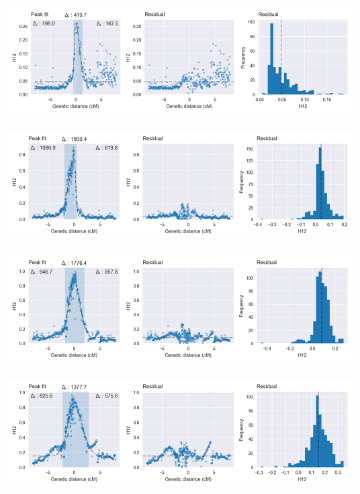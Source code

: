 \documentclass[a4paper,11pt,abstracton,hidelinks]{scrartcl}
\begin{document}
\begin{figure}[t!]
\begin{subfigure}[t]{0.32\textwidth}
    \end{subfigure}
    \begin{subfigure}[t]{0.32\textwidth}
        \centering
        \caption{}
        \includegraphics[width=1.1\textwidth,center,trim=0 27 380 0, clip]{artwork/chapter5/peak_fit_h12_cyp9k1_gns.png}
    \end{subfigure}
    \vspace{0cm}
    \begin{subfigure}[t]{0.32\textwidth}
        \centering
        \caption{}
        \includegraphics[width=1.1\textwidth,center,trim=0 0 380 0, clip]{artwork/chapter5/peak_fit_h12_vgsc_bfm.png}
    \end{subfigure}
    \hfill
    \begin{subfigure}[t]{0.32\textwidth}
        \centering
        \caption{}
        \includegraphics[width=1.1\textwidth,center,trim=0 0 380 0, clip]{artwork/chapter5/peak_fit_h12_vgsc_bfs.png}
    \end{subfigure}
    \begin{subfigure}[t]{0.32\textwidth}
        \centering
        \caption{}
        \includegraphics[width=1.1\textwidth,center,trim=0 0 380 0, clip]{artwork/chapter5/peak_fit_h12_vgsc_ugs.png}

\end{subfigure}
\end{figure}
\end{document}
